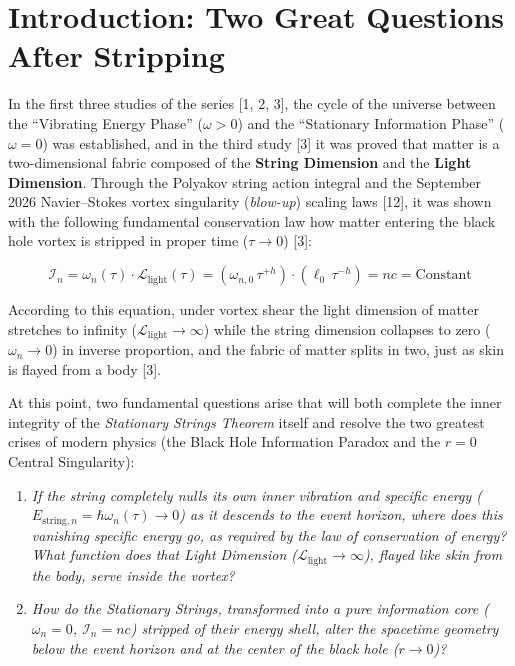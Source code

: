 \documentclass[12pt,a4paper]{article}
\begin{document}
\section{Introduction: Two Great Questions After Stripping}

In the first three studies of the series [1, 2, 3], the cycle of the universe between the ``Vibrating Energy Phase'' ($\omega > 0$) and the ``Stationary Information Phase'' ($\omega = 0$) was established, and in the third study [3] it was proved that matter is a two-dimensional fabric composed of the \textbf{String Dimension} and the \textbf{Light Dimension}. Through the Polyakov string action integral and the September 2026 Navier--Stokes vortex singularity (\textit{blow-up}) scaling laws [12], it was shown with the following fundamental conservation law how matter entering the black hole vortex is stripped in proper time ($\tau \to 0$) [3]:

\begin{equation}
\mathcal{I}_n = \omega_n(\tau) \cdot \mathcal{L}_{\text{light}}(\tau) = \left( \omega_{n,0} \, \tau^{+h} \right) \cdot \left( \ell_0 \, \tau^{-h} \right) = n c = \text{Constant}
\end{equation}

According to this equation, under vortex shear the light dimension of matter stretches to infinity ($\mathcal{L}_{\text{light}} \to \infty$) while the string dimension collapses to zero ($\omega_n \to 0$) in inverse proportion, and the fabric of matter splits in two, just as skin is flayed from a body [3].

At this point, two fundamental questions arise that will both complete the inner integrity of the \textit{Stationary Strings Theorem} itself and resolve the two greatest crises of modern physics (the Black Hole Information Paradox and the $r=0$ Central Singularity):
\begin{enumerate}
    \item \textit{If the string completely nulls its own inner vibration and specific energy ($E_{\text{string}, n} = \hbar \omega_n(\tau) \to 0$) as it descends to the event horizon, where does this vanishing specific energy go, as required by the law of conservation of energy? What function does that Light Dimension ($\mathcal{L}_{\text{light}} \to \infty$), flayed like skin from the body, serve inside the vortex?}
    \item \textit{How do the Stationary Strings, transformed into a pure information core ($\omega_n = 0$, $\mathcal{I}_n = n c$) stripped of their energy shell, alter the spacetime geometry below the event horizon and at the center of the black hole ($r \to 0$)?}
\end{enumerate}
\end{document}
